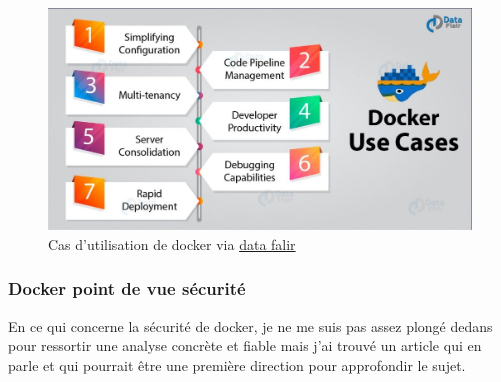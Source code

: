 \documentclass[
    iai, %
    il, %
]{heig-tb}
\begin{document}
\begin{center}
    \begin{figure}[H]
        \includegraphics[width=\textwidth]{./assets/figures/docker-use-cases.jpg}
        \caption[Cas d'utilisation de docker]{Cas d'utilisation de docker via \href{https://data-flair.training/blogs/wp-content/uploads/sites/2/2018/10/}{data falir}
            \label{docker-use-cases}}
    \end{figure}
\end{center}

\subsubsection{Docker point de vue sécurité}
En ce qui concerne la sécurité de \Gls{docker}, je ne me suis pas assez plongé dedans pour ressortir une
analyse concrète et fiable mais j'ai trouvé un article \cite{combe} qui en parle et qui pourrait
être une première direction pour approfondir le sujet.



\end{document}
